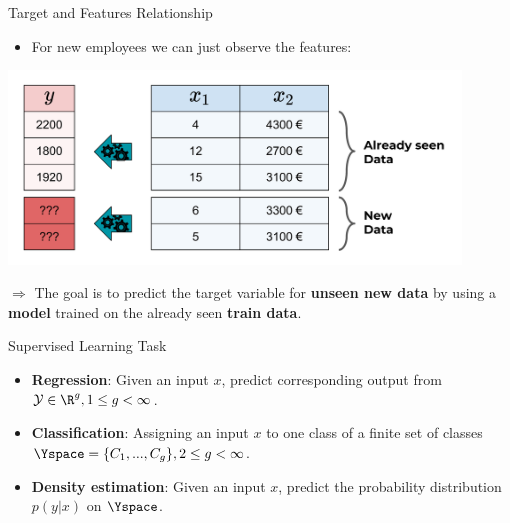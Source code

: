 \begin{frame}{Target and Features Relationship}

\begin{itemize}

\item
  For new employees we can just observe the features:
\end{itemize}

\vspace{-0.5cm}

\scriptsize

\begin{center}\includegraphics[width=0.9\textwidth]{plots/new_data1_web} \end{center}

\normalsize 

\vspace{-0.5cm}

\(\Rightarrow\) The goal is to predict the target variable for
\textbf{unseen new data} by using a \textbf{model} trained on the
already seen \textbf{train data}.

\end{frame}

\begin{frame}{Supervised Learning Task}

\begin{itemize}
\item \textbf{Regression}: Given an input $x$, predict corresponding output from $\mathcal{Y} \in \R^g, 1 \leq g < \infty$.
\item \textbf{Classification}: Assigning an input $x$ to one class of a finite set of classes $\Yspace = \{C_1,...,C_g\}, 2 \leq g < \infty$.
\item \textbf{Density estimation}: Given an input $x$, predict the probability distribution $p(y|x)$ on $\Yspace$.


 
\end{itemize}

\end{frame}

